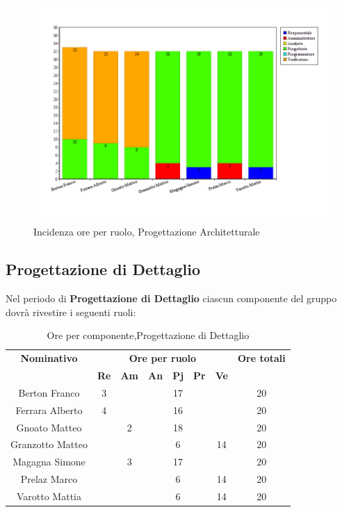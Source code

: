 \begin{figure}[H]
	\centering
	\includegraphics[scale=0.4]{immagini/Grafi/GrafoPA}
	\caption{Incidenza ore per ruolo, Progettazione Architetturale}
\end{figure}

\subsection{Progettazione di Dettaglio}
Nel periodo di \textbf{Progettazione di Dettaglio} ciascun componente del gruppo dovrà rivestire i seguenti ruoli:
\begin{table}[H]
	\begin{center}
		\begin{tabular}{|c|c|c|c|c|c|c|c|}
			\hline
			\textbf{Nominativo} & \multicolumn{6}{c|}{\textbf{Ore per ruolo}} & \textbf{Ore totali} \\
			& \textbf{Re} & \textbf{Am} & \textbf{An} & \textbf{Pj} & \textbf{Pr} & \textbf{Ve} & \\
			\hline
			Berton Franco		&	3	&		&		&	17	&		&		&	20	\\ 
			\hline
			Ferrara Alberto		&	4	&		&		&	16	&		&		& 	20	\\ 
			\hline
			Gnoato Matteo		&		&	2	&		&	18	&		&		&	20	\\ 
			\hline									
			Granzotto Matteo	&		&	 	&		&	6	&	 	& 	14	&	20	\\
			\hline
			Magagna Simone 		&		&	3	&		&	17	&		& 		&	20	\\ 
			\hline
			Prelaz Marco 		& 		&		&		&	6	&		&	14	&	20	\\ 
			\hline
			Varotto Mattia 		&		&		&		&	6	&		&	14	& 	20	\\ 
			\hline
		\end{tabular}
	\end{center}
	\caption{Ore per componente,Progettazione di Dettaglio}
\end{table}

